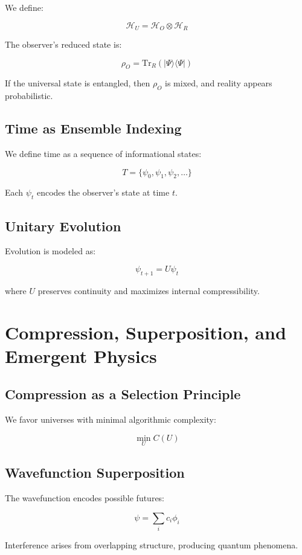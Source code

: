 \documentclass[11pt]{article}
\begin{document}
We define:

\[
      \mathcal{H}_U = \mathcal{H}_O \otimes \mathcal{H}_R
\]

The observer's reduced state is:

\[
      \rho_O = \mathrm{Tr}_R \left( |\Psi\rangle \langle \Psi| \right)
\]

If the universal state is entangled, then \(\rho_O\) is mixed, and reality appears probabilistic.

\subsection*{Time as Ensemble Indexing}

We define time as a sequence of informational states:

\[
      T = \{ \psi_0, \psi_1, \psi_2, \ldots \}
\]

Each \(\psi_t\) encodes the observer’s state at time \(t\).

\subsection*{Unitary Evolution}

Evolution is modeled as:

\[
      \psi_{t+1} = U \psi_t
\]

where \(U\) preserves continuity and maximizes internal compressibility.

\section{Compression, Superposition, and Emergent Physics}

\subsection{Compression as a Selection Principle}

We favor universes with minimal algorithmic complexity:

\[
      \min_U C(U)
\]

\subsection{Wavefunction Superposition}

The wavefunction encodes possible futures:

\[
      \psi = \sum_i c_i \phi_i
\]

Interference arises from overlapping structure, producing quantum phenomena.
\end{document}
